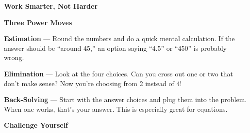 \clearpage
\thispagestyle{empty}
{\sffamily

\begin{center}
{\fontsize{22}{26}\selectfont\bfseries\color{funOrange} \faToolbox\hspace{3mm}Work Smarter, Not Harder\hspace{3mm}\faToolbox}

\vspace{2mm}
{\color{funGray}\hrulefill}
\end{center}

\vspace{3mm}

\begin{tcolorbox}[
    enhanced,
    colback=funOrangeLight,
    colframe=funOrange!50,
    arc=10pt,
    boxrule=1.5pt,
    left=6mm, right=6mm, top=5mm, bottom=5mm,
]
{\large\bfseries\color{funOrangeDark} \faHatWizard\hspace{2mm}Three Power Moves}

\vspace{3mm}

\textcolor{funOrange}{\faDice}\hspace{2mm}\textbf{Estimation} — Round the numbers and do a quick mental calculation. If the answer should be ``around 45,'' an option saying ``4.5'' or ``450'' is probably wrong.

\vspace{3mm}

\textcolor{funOrange}{\faBan}\hspace{2mm}\textbf{Elimination} — Look at the four choices. Can you cross out one or two that don't make sense? Now you're choosing from 2 instead of 4!

\vspace{3mm}

\textcolor{funOrange}{\faUndoAlt}\hspace{2mm}\textbf{Back-Solving} — Start with the answer choices and plug them into the problem. When one works, that's your answer. This is especially great for equations.
\end{tcolorbox}

\vspace{3mm}

\begin{tcolorbox}[
    enhanced,
    colback=funYellowLight,
    colframe=funYellow!60,
    arc=10pt,
    boxrule=1pt,
    left=6mm, right=6mm, top=4mm, bottom=4mm,
]
{\bfseries\color{funYellowDark} \faLightbulb\hspace{2mm}Challenge Yourself}


\end{tcolorbox}}
